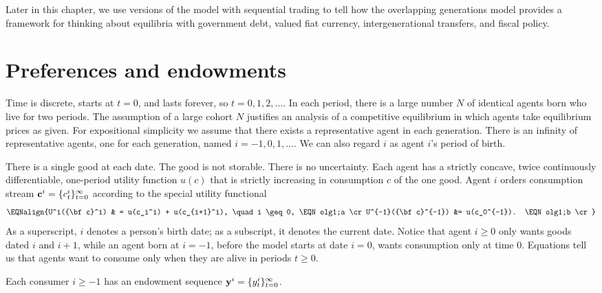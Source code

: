 

Later in this chapter,
  we use versions of the model with
sequential trading  to tell how the overlapping
generations model provides  a framework for thinking about equilibria
with government debt, valued fiat currency, intergenerational
transfers, and fiscal policy.



\section{Preferences and endowments}
Time is discrete, starts at $t=0$,
and  lasts forever, so $t=0, 1, 2, \ldots$. In each period, 
there is a large number $N$ of identical agents born who 
live for two periods. The assumption of a large cohort
$N$ justifies an  analysis of a competitive equilibrium
in which agents take equilibrium prices as given. 
For expositional simplicity
we assume that there exists  a representative agent in each generation.
There is an infinity of representative agents,
one for each generation,
named $i=-1, 0, 1, \ldots$.  We can also regard $i$ as 
agent $i$'s period of birth.

  There is a single good at each date. The good is not storable.  There is no uncertainty.
  Each agent has a
strictly concave, twice  continuously
differentiable, one-period utility function $u(c)$ that
is strictly increasing in consumption  $c$ of the one good.
  Agent $i$ orders consumption stream  
${\bf c}^i = \{c_t^i\}_{t=0}^\infty$ according to the
  special  utility functional
$$\EQNalign{U^i({\bf c}^i) & = u(c_i^i) + u(c_{i+1}^i), \quad i \geq 0,
 \EQN olg1;a \cr
    U^{-1}({\bf c}^{-1}) &= u(c_0^{-1}). \EQN olg1;b \cr} $$
As a superscript, $i$ denotes a person's birth date; as a subscript, it denotes the current date.  
Notice that agent $i \geq 0 $ only wants goods dated $i$ and $i+1$, while an agent born at $i=-1$, before the
model starts at date $i =0$, wants consumption only at time $0$.
Equations  tell us  that agents
want to consume only when they are alive in periods $t\geq 0$.

Each consumer $i \geq -1$ has an endowment sequence 
${\bf y}^i = \{y_t^i\}_{t=0}^\infty$.

